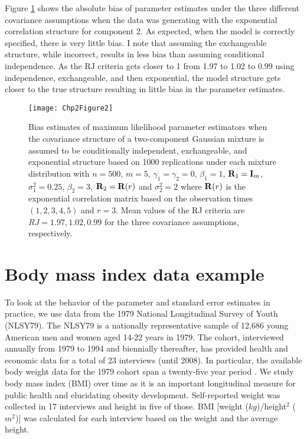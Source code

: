 Figure \ref{fig:2-2} shows the absolute bias of parameter estimates under the three different covariance assumptions when the data was generating with the exponential correlation structure for component 2. As expected, when the model is correctly specified, there is very little bias. I note that assuming the exchangeable structure, while incorrect, results in less bias than assuming conditional independence. As the RJ criteria gets closer to 1 from 1.97 to 1.02 to 0.99 using independence, exchangeable, and then exponential, the model structure gets closer to the true structure resulting in little bias in the parameter estimates.
\begin{figure}[ht]
\centering
\texttt{[image: Chp2Figure2]}
\caption{Bias estimates of maximum likelihood parameter estimators when the covariance structure of a two-component Gaussian mixture is assumed to be conditionally independent, exchangeable, and exponential structure based on 1000 replications under each mixture distribution with $n=500$, $m=5$, $\gamma_1=\gamma_2=0$, $\beta_{1}=1$, $\mathbf R_1=\mathbf I_{m}$, $\sigma_1^{2}=0.25$, $\beta_2=3$, $\mathbf R_2=\mathbf R(r)$ and $\sigma_2^{2}=2$ where $\mathbf R(r)$ is the exponential correlation matrix based on the observation times $(1,2,3,4,5)$ and $r=3$. Mean values of the RJ criteria are $RJ = 1.97, 1.02, 0.99$ for the three covariance assumptions, respectively.}
\label{fig:2-2}
\end{figure}

\section{Body mass index data example} \label{chp2:sec:data}
To look at the behavior of the parameter and standard error estimates in practice, we use data from the 1979 National Longitudinal Survey of Youth (NLSY79). The NLSY79 is a nationally representative sample of 12,686 young American men and women aged 14-22 years in 1979. The cohort, interviewed annually from 1979 to 1994 and biennially thereafter, has provided health and economic data for a total of 23 interviews (until 2008).  In particular, the available body weight data for the 1979 cohort span a twenty-five year period \cite{ostbye2011}. We study body mass index (BMI) over time as it is an important longitudinal measure for public health and elucidating obesity development.  Self-reported weight was collected in 17 interviews and height in five of those. BMI [weight ($kg$)/height$^{2}$ ($m^{2}$)] was calculated for each interview based on the weight and the average height.\\

